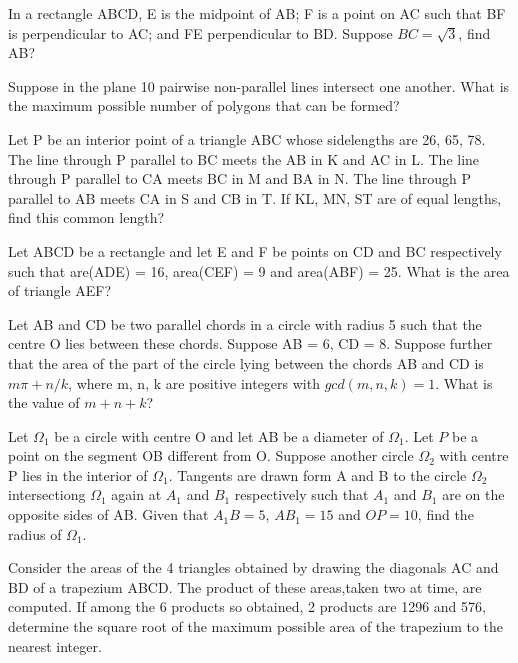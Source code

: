\item In a rectangle ABCD, E is the midpoint of AB; F is a point on AC such that BF is perpendicular to AC; and FE perpendicular to BD. Suppose $BC = \sqrt{3}$, find AB?

\item Suppose in the plane 10 pairwise non-parallel lines intersect one another. What is the maximum possible number of polygons that can be formed?

\item Let P be an interior point of a triangle ABC whose sidelengths are 26, 65, 78. The line through P parallel to BC meets the AB in K and AC in L. The line through P parallel to CA meets BC in M and BA in N. The line through P parallel to AB meets CA in S and CB in T. If KL, MN, ST are of equal lengths, find this common length?

\item Let ABCD be a rectangle and let E and F be points on CD and BC respectively such that are(ADE) = 16, area(CEF) = 9 and area(ABF) = 25. What is the area of triangle AEF?

\item Let AB and CD be two parallel chords in a circle with radius 5 such that the centre O lies between these chords. Suppose AB = 6, CD = 8. Suppose further that the area of the part of the circle lying between the chords AB and CD is 
$m\pi + n/k$, where m, n, k are positive integers with $gcd(m, n, k) = 1$. What is the value of $m + n + k$?

\item Let $\Omega_1$ be a circle with centre O and let AB be a diameter of $\Omega_1$. Let $P$ be a point on the segment OB different from O. Suppose another circle $\Omega_2$ with centre P lies in the interior of $\Omega_1$. Tangents are drawn form A and B to the circle $\Omega_2$ intersectiong $\Omega_1$ again at $A_1$ and $B_1$ respectively such that $A_1$ and $B_1$ are on the opposite sides of AB. Given that $A_1B = 5$, $AB_1 = 15$ and $OP = 10$, find the radius of $\Omega_1$.

\item Consider the areas of the 4 triangles obtained by drawing the diagonals AC and BD of a trapezium ABCD. The product of these areas,taken two at time, are computed. If among the 6 products so obtained, 2 products are 1296 and 576, determine the square root of the maximum possible area of the trapezium to the nearest integer.